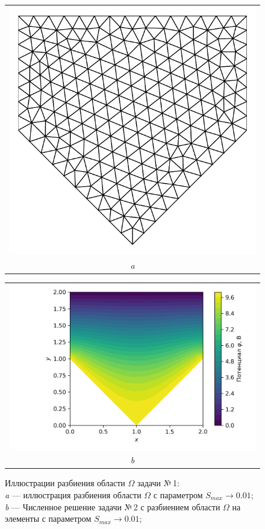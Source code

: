 \documentclass[12pt, a4paper]{article}
\begin{document}
			\newpage
			
			\begin{figure}[h]       
				\vspace{5.0mm} 
				\centering
				{ 
					\begin{tabular}{@{}c@{}}
						\includegraphics[width=0.35\linewidth]{Test_domain_4_mesh001_calfem_net.pdf} \\[\abovecaptionskip]
						\textit{a} 
					\end{tabular}                          
				} 
				\vspace{\floatsep}
				{ 
					\begin{tabular}{@{}c@{}}
						\includegraphics[width=0.55\linewidth]{Test_domain_4_mesh001_calfem.png}\\[\abovecaptionskip]
						\textit{b} 
					\end{tabular}                                 
				}
				
				\caption{Иллюстрации разбиения области $\Omega$ задачи №\,1:\\
					\textit{a} --- иллюстрация разбиения области $\Omega$ с параметром $S_{max} \rightarrow 0.01$; \\
					\textit{b} --- Численное решение задачи №\,2 с разбиением области $\Omega$ на  элементы с параметром $S_{max} \rightarrow 0.01$; \\
				} 
			\end{figure}
			
\end{document}
